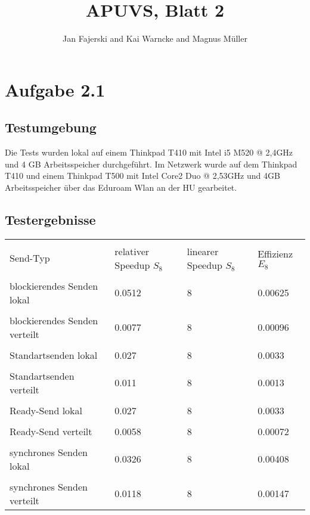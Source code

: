 \documentclass[a4paper,
12pt,
BCOR12mm,
]{scrartcl}
\title{APUVS, Blatt 2}
\author{Jan Fajerski and Kai Warncke and Magnus Müller}
\begin{document}
\maketitle  

\section*{Aufgabe 2.1}
  \subsection*{Testumgebung}
    Die Tests wurden lokal auf einem Thinkpad T410 mit Intel i5 M520 @ 2,4GHz und 4 GB Arbeitsspeicher durchgeführt.
    Im Netzwerk wurde auf dem Thinkpad T410 und einem Thinkpad T500 mit Intel Core2 Duo @ 2,53GHz und 4GB Arbeitsspeicher über das Eduroam Wlan
    an der HU gearbeitet.
  \subsection*{Testergebnisse}
{\scriptsize
\begin{tabular}[10pt]{|p{3cm}|p{3cm}|p{3cm}|p{3cm}|}
      \hline &&&\\
      Send-Typ                      & relativer Speedup $S_8$       & linearer Speedup  $S_8$       & Effizienz $E_8$   \\
      \hline &&&\\
      blockierendes Senden lokal    & 0.0512                        & 8                             & 0.00625           \\
      \hline &&&\\
      blockierendes Senden verteilt & 0.0077                        & 8                             & 0.00096           \\
      \hline &&&\\
      Standartsenden lokal          & 0.027                         & 8                             & 0.0033            \\
      \hline &&&\\
      Standartsenden verteilt       & 0.011                         & 8                             & 0.0013            \\
      \hline &&&\\
      Ready-Send lokal              & 0.027                         & 8                             & 0.0033            \\
      \hline &&&\\
      Ready-Send verteilt           & 0.0058                        & 8                             & 0.00072           \\
      \hline &&&\\
      synchrones Senden lokal       & 0.0326                        & 8                             & 0.00408           \\
      \hline &&&\\
      synchrones Senden verteilt    & 0.0118                        & 8                             & 0.00147           \\
      \hline 
    \end{tabular}}
\end{document}
